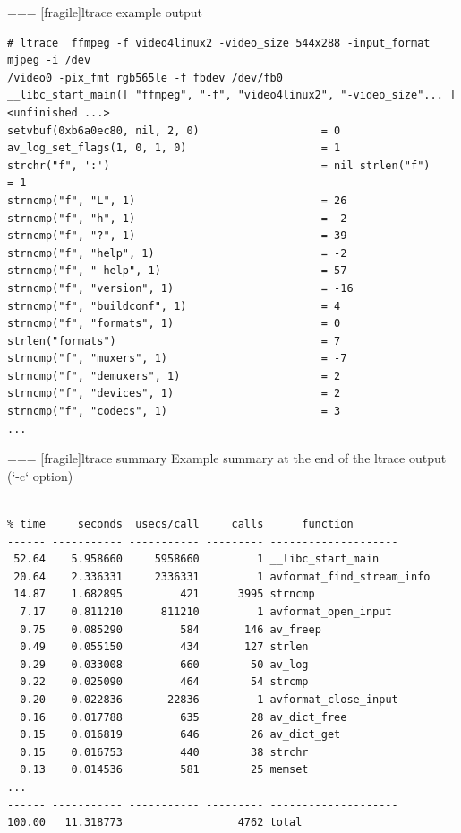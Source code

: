 === [fragile]{ltrace example output}
  \scriptsize
  \begin{block}{}
\begin{verbatim}
# ltrace  ffmpeg -f video4linux2 -video_size 544x288 -input_format mjpeg -i /dev
/video0 -pix_fmt rgb565le -f fbdev /dev/fb0
__libc_start_main([ "ffmpeg", "-f", "video4linux2", "-video_size"... ] <unfinished ...>
setvbuf(0xb6a0ec80, nil, 2, 0)                   = 0
av_log_set_flags(1, 0, 1, 0)                     = 1
strchr("f", ':')                                 = nil strlen("f")                                      = 1
strncmp("f", "L", 1)                             = 26
strncmp("f", "h", 1)                             = -2
strncmp("f", "?", 1)                             = 39
strncmp("f", "help", 1)                          = -2
strncmp("f", "-help", 1)                         = 57
strncmp("f", "version", 1)                       = -16
strncmp("f", "buildconf", 1)                     = 4
strncmp("f", "formats", 1)                       = 0
strlen("formats")                                = 7
strncmp("f", "muxers", 1)                        = -7
strncmp("f", "demuxers", 1)                      = 2
strncmp("f", "devices", 1)                       = 2
strncmp("f", "codecs", 1)                        = 3
...
\end{verbatim}
\end{block}


=== [fragile]{ltrace summary}
  Example summary at the end of the ltrace output (`-c` option)
  \scriptsize
  \begin{block}{}
\begin{verbatim}

% time     seconds  usecs/call     calls      function
------ ----------- ----------- --------- --------------------
 52.64    5.958660     5958660         1 __libc_start_main
 20.64    2.336331     2336331         1 avformat_find_stream_info
 14.87    1.682895         421      3995 strncmp
  7.17    0.811210      811210         1 avformat_open_input
  0.75    0.085290         584       146 av_freep
  0.49    0.055150         434       127 strlen
  0.29    0.033008         660        50 av_log
  0.22    0.025090         464        54 strcmp
  0.20    0.022836       22836         1 avformat_close_input
  0.16    0.017788         635        28 av_dict_free
  0.15    0.016819         646        26 av_dict_get
  0.15    0.016753         440        38 strchr
  0.13    0.014536         581        25 memset
...
------ ----------- ----------- --------- --------------------
100.00   11.318773                  4762 total
\end{verbatim}
  \end{block}

